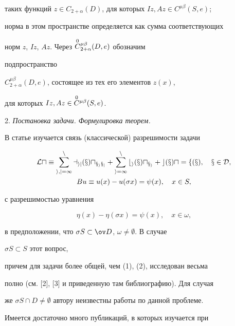 таких функций $z\in C_{2+\alpha}(D)$, для которых $Iz,Az\in 


C^{\mu\beta}(S,e)$; 


норма в этом пространстве определяется как сумма соответствующих 


норм $z$, $Iz$, $Az$. Через $\overset{0}{C}{}^{\mu\beta}_{2+\alpha}(D,e)$ обозначим 


подпространство 


$C^{\mu\beta}_{2+\alpha}(D,e)$, состоящее из тех его элементов $z(x)$, 


для которых $Iz,Az\in\overset{0}{C}{}^{\mu\beta}(S,e)$. 


\medskip 


 


2. {\it Постановка задачи. Формулировка теорем.} 


 


В статье изучается связь (классической) разрешимости задачи 


\begin{gather} 


\cal L u\equiv\sum^n_{i,j=1}a_{ij}(x)u_{x_i x_j}+ 


\sum^n_{i=1}b_i(x)u_{x_i}+c(x)u=f(x),\quad x\in D,\\ 


% 


B u\equiv u(x)-u(\sigma x)=\psi(x),\quad x\in S,


\end{gather} 


с разрешимостью уравнения 


\begin{equation} 


\eta(x)-\eta(\sigma x)=\psi(x),\quad x\in\omega, 


\end{equation} 


в предположении, что $\sigma S\subset\ov D$, $\omega\ne\emptyset$. В случае 


$\sigma S\subset S$ этот вопрос, 


причем для задачи более общей, чем (1), (2), исследован весьма 


полно (см. [2], [3] и приведенную там библиографию). Для случая 


же $\sigma S\cap D\ne\emptyset$ автору неизвестны работы по данной проблеме. 


Имеется достаточно много публикаций, в которых изучается при 


